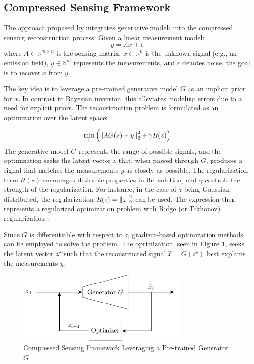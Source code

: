 \subsection{Compressed Sensing Framework}

The approach proposed by \textcite{CSUsingAI} integrates generative models into the compressed sensing reconstruction process.
Given a linear measurement model:
\begin{equation}
 y = A x + \epsilon
\end{equation}
where $A \in \mathbb{R}^{m \times n}$ is the sensing matrix, $x \in \mathbb{R}^n$ is the unknown signal (e.g., an emission field), $y \in \mathbb{R}^m$ represents the measurements, and $\epsilon$ denotes noise, the goal is to recover $x$ from $y$.

The key idea is to leverage a pre-trained generative model $G$ as an implicit prior for $x$.
In contrast to Bayesian inversion, this alleviates modeling errors due to a need for explicit priors.
The reconstruction problem is formulated as an optimization over the latent space:

\begin{equation}
 \min_{z}{\left( \left\lVert A G(z) - y\right\rVert_2^2 + \gamma R(z) \right)}
\end{equation}
The generative model $G$ represents the range of possible signals, and the optimization seeks the latent vector $z$ that, when passed through $G$, produces a signal that matches the measurements $y$ as closely as possible.
The regularization term $R(z)$ encourages desirable properties in the solution, and $\gamma$ controls the strength of the regularization.
For instance, in the case of $z$ being Gaussian distributed, the regularization $R(z) = \left\lVert z\right\rVert_2^2$ can be used.
The expression then represents a regularized optimization problem with Ridge (or Tikhonov) regularization \parencite{Ridge}.

Since $G$ is differentiable with respect to $z$, gradient-based optimization methods can be employed to solve the problem.
The optimization, seen in Figure \ref{fig:gen_solver}, seeks the latent vector $z^{\star}$ such that the reconstructed signal $\hat{x} = G(z^{\star})$ best explains the measurements $y$.

\begin{figure}[htb]
    \centering
    \includegraphics[width=0.75\textwidth]{figures/02_related_work/latent_variable_optimization/build/latent_variable_optimization.pdf}
    \caption{Compressed Sensing Framework Leveraging a Pre-trained Generator $G$ \parencite{CSUsingAI}}
    \label{fig:gen_solver}
\end{figure}

